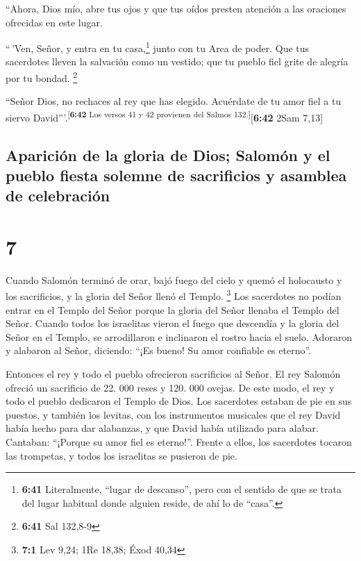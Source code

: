  ``Ahora, Dios mío, abre tus ojos y que tus oídos presten
atención a las oraciones ofrecidas en este lugar.

 ``\,'Ven, Señor, y entra en tu casa,\footnote{\textbf{6:41}
  Literalmente, ``lugar de descanso'', pero con el sentido de que se
  trata del lugar habitual donde alguien reside, de ahí lo de ``casa''.}
junto con tu Arca de poder. Que tus sacerdotes lleven la salvación como
un vestido; que tu pueblo fiel grite de alegría por tu bondad.
\footnote{\textbf{6:41} Sal 132,8-9}

 ``Señor Dios, no rechaces al rey que has elegido.
Acuérdate de tu amor fiel a tu siervo
David'''.\textsuperscript{{[}\textbf{6:42} Los versos 41 y 42 provienen
del Salmos 132.{]}}{[}\textbf{6:42} 2Sam 7,13{]}

\hypertarget{apariciuxf3n-de-la-gloria-de-dios-salomuxf3n-y-el-pueblo-fiesta-solemne-de-sacrificios-y-asamblea-de-celebraciuxf3n}{%
\subsection{Aparición de la gloria de Dios; Salomón y el pueblo fiesta
solemne de sacrificios y asamblea de
celebración}\label{apariciuxf3n-de-la-gloria-de-dios-salomuxf3n-y-el-pueblo-fiesta-solemne-de-sacrificios-y-asamblea-de-celebraciuxf3n}}

\hypertarget{section-6}{%
\section{7}\label{section-6}}

 Cuando Salomón terminó de orar, bajó fuego del cielo y
quemó el holocausto y los sacrificios, y la gloria del Señor llenó el
Templo. \footnote{\textbf{7:1} Lev 9,24; 1Re 18,38; Éxod 40,34}
 Los sacerdotes no podían entrar en el Templo del Señor
porque la gloria del Señor llenaba el Templo del Señor. 
Cuando todos los israelitas vieron el fuego que descendía y la gloria
del Señor en el Templo, se arrodillaron e inclinaron el rostro hacia el
suelo. Adoraron y alabaron al Señor, diciendo: ``¡Es bueno! Su amor
confiable es eterno''.

 Entonces el rey y todo el pueblo ofrecieron sacrificios
al Señor.  El rey Salomón ofreció un sacrificio de 22. 000
reses y 120. 000 ovejas. De este modo, el rey y todo el pueblo dedicaron
el Templo de Dios.  Los sacerdotes estaban de pie en sus
puestos, y también los levitas, con los instrumentos musicales que el
rey David había hecho para dar alabanzas, y que David había utilizado
para alabar. Cantaban: ``¡Porque su amor fiel es eterno!''. Frente a
ellos, los sacerdotes tocaron las trompetas, y todos los israelitas se
pusieron de pie.

